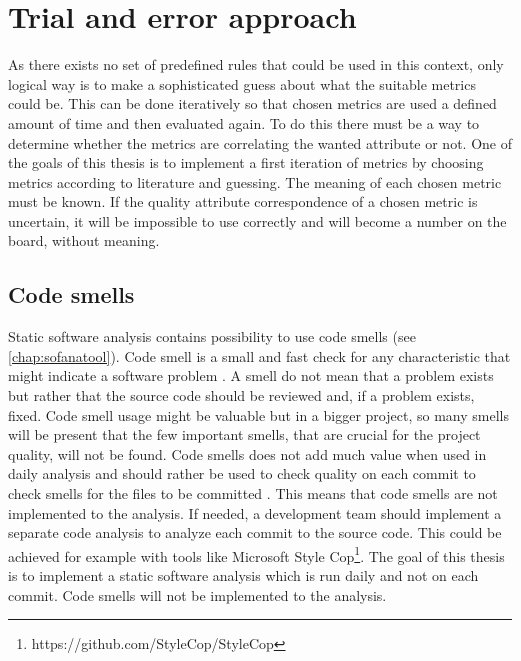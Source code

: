 %

\section{Trial and error approach}

As there exists no set of predefined rules that could be used in this context, only logical way is to make a sophisticated guess about what the suitable metrics could be. This can be done iteratively so that chosen metrics are used a defined amount of time and then evaluated again. To do this there must be a way to determine whether the metrics are correlating the wanted attribute or not. One of the goals of this thesis is to implement a first iteration of metrics by choosing metrics according to literature and guessing. The meaning of each chosen metric must be known. If the quality attribute correspondence of a chosen metric is uncertain, it will be impossible to use correctly and will become a number on the board, without meaning.

\subsection{Code smells}

Static software analysis contains possibility to use code smells (see \autoref{chap:sofanatool}). Code smell is a small and fast check for any characteristic that might indicate a software problem \cite{fowlercodesmell}. A smell do not mean that a problem exists but rather that the source code should be reviewed and, if a problem exists, fixed. Code smell usage might be valuable but in a bigger project, so many smells will be present that the few important smells, that are crucial for the project quality, will not be found. Code smells does not add much value when used in daily analysis and should rather be used to check quality on each commit to check smells for the files to be committed \cite{tufano2015and}. This means that code smells are not implemented to the analysis. If needed, a development team should implement a separate code analysis to analyze each commit to the source code. This could be achieved for example with tools like Microsoft Style Cop\footnote{https://github.com/StyleCop/StyleCop}. The goal of this thesis is to implement a static software analysis which is run daily and not on each commit. Code smells will not be implemented to the analysis. 

